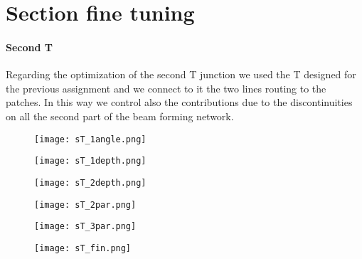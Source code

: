 \section{Section fine tuning}


\paragraph{Second T}
Regarding the optimization of the second T junction we used the T designed for the previous assignment and we connect to it the two lines routing to the patches. In this way we control also the contributions due to the discontinuities on all the second part of the beam forming network.

\begin{figure}[H]
	\centering
	\texttt{[image: sT\_1angle.png]}
	\caption{}
	\label{sT_1angle}
\end{figure}
\begin{figure}[H]
	\centering
	\texttt{[image: sT\_1depth.png]}
	\caption{}
	\label{sT_1depth}
\end{figure}
\begin{figure}[H]
	\centering
	\texttt{[image: sT\_2depth.png]}
	\caption{}
	\label{sT_2depth}
\end{figure}
\begin{figure}[H]
	\centering
	\texttt{[image: sT\_2par.png]}
	\caption{}
	\label{sT_2par}
\end{figure}
\begin{figure}[H]
	\centering
	\texttt{[image: sT\_3par.png]}
	\caption{}
	\label{sT_3par}
\end{figure}
\begin{figure}[H]
	\centering
	\texttt{[image: sT\_fin.png]}
	\caption{}
	\label{sT_fin}
\end{figure}